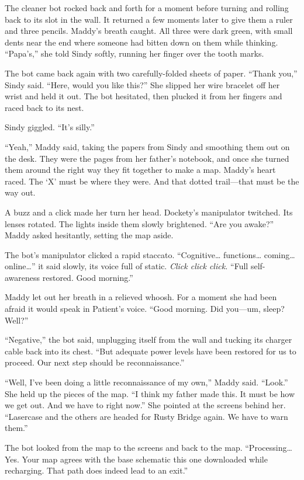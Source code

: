 \documentclass[10pt]{article}
\begin{document}
The cleaner bot rocked back and forth for a moment before turning and
rolling back to its slot in the wall. It returned a few moments later to
give them a ruler and three pencils. Maddy's breath caught. All three
were dark green, with small dents near the end where someone had bitten
down on them while thinking. ``Papa's,'' she told Sindy softly, running
her finger over the tooth marks.

The bot came back again with two carefully-folded sheets of paper.
``Thank you,'' Sindy said. ``Here, would you like this?'' She slipped
her wire bracelet off her wrist and held it out. The bot hesitated, then
plucked it from her fingers and raced back to its nest.

Sindy giggled. ``It's silly.''

``Yeah,'' Maddy said, taking the papers from Sindy and smoothing them
out on the desk. They were the pages from her father's notebook, and
once she turned them around the right way they fit together to make a
map. Maddy's heart raced. The `X' must be where they were. And that
dotted trail---that must be the way out.

A buzz and a click made her turn her head. Dockety's manipulator
twitched. Its lenses rotated. The lights inside them slowly brightened.
``Are you awake?'' Maddy asked hesitantly, setting the map aside.

The bot's manipulator clicked a rapid staccato. ``Cognitive\ldots{}
functions\ldots{} coming\ldots{} online\ldots{}'' it said slowly, its
voice full of static. \emph{Click click click.} ``Full self-awareness
restored. Good morning.''

Maddy let out her breath in a relieved whoosh. For a moment she had been
afraid it would speak in Patient's voice. ``Good morning. Did you---um,
sleep? Well?''

``Negative,'' the bot said, unplugging itself from the wall and tucking
its charger cable back into its chest. ``But adequate power levels have
been restored for us to proceed. Our next step should be
reconnaissance.''

``Well, I've been doing a little reconnaissance of my own,'' Maddy said.
``Look.'' She held up the pieces of the map. ``I think my father made
this. It must be how we get out. And we have to right now.'' She pointed
at the screens behind her. ``Lasercase and the others are headed for
Rusty Bridge again. We have to warn them.''

The bot looked from the map to the screens and back to the map.
``Processing\ldots{} Yes. Your map agrees with the base schematic this
one downloaded while recharging. That path does indeed lead to an
exit.''
\end{document}
